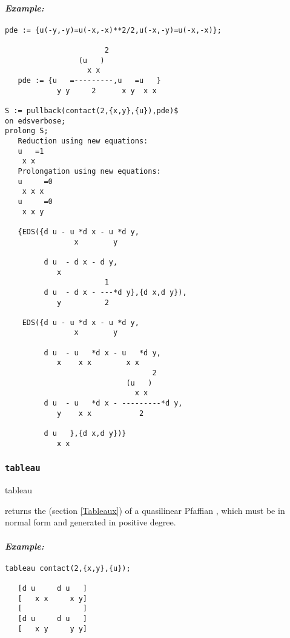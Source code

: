 \paragraph{\it Example:}
\begin{verbatim}
pde := {u(-y,-y)=u(-x,-x)**2/2,u(-x,-y)=u(-x,-x)};

                       2
                 (u   )
                   x x
   pde := {u   =---------,u   =u   }
            y y     2      x y  x x 

S := pullback(contact(2,{x,y},{u}),pde)$
on edsverbose;
prolong S;
   Reduction using new equations:  
   u   =1
    x x 
   Prolongation using new equations:  
   u     =0
    x x x  
   u     =0
    x x y 
   
   {EDS({d u - u *d x - u *d y,
                x        y 
   
         d u  - d x - d y,
            x 
                       1
         d u  - d x - ---*d y},{d x,d y}),
            y          2 
   
    EDS({d u - u *d x - u *d y,
                x        y 
   
         d u  - u   *d x - u   *d y,
            x    x x        x x 
                                  2
                            (u   )
                              x x
         d u  - u   *d x - ---------*d y,
            y    x x           2 
   
         d u   },{d x,d y})}
            x x 
\end{verbatim}

\subsubsection{\tt tableau}
\label{tableau}

\begin{edssyntax}
	tableau 
\end{edssyntax}
returns the  (section \ref{Tableaux}) of a quasilinear
Pfaffian , which must be in normal form and generated in positive
degree.

\paragraph{\it Example:}
\begin{verbatim}
tableau contact(2,{x,y},{u});

   [d u     d u   ]
   [   x x     x y]
   [              ]
   [d u     d u   ]
   [   x y     y y] 
\end{verbatim}

